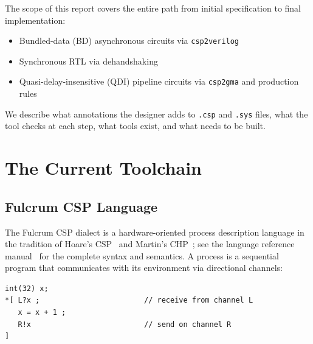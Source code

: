 \documentclass[11pt]{article}
\begin{document}
The scope of this report covers the entire path from initial
specification to final implementation:
\begin{itemize}
\item Bundled-data (BD) asynchronous circuits via \texttt{csp2verilog}
\item Synchronous RTL via dehandshaking
\item Quasi-delay-insensitive (QDI) pipeline circuits via
  \texttt{csp2gma} and production rules
\end{itemize}
We describe what annotations the designer adds to \texttt{.csp} and
\texttt{.sys} files, what the tool checks at each step, what tools
exist, and what needs to be built.

\section{The Current Toolchain}
\label{sec:current}

\subsection{Fulcrum CSP Language}

The Fulcrum CSP dialect is a hardware-oriented
process description language in the tradition of Hoare's
CSP~\cite{hoare1985} and Martin's CHP~\cite{martin1990}; see the
language reference manual~\cite{nystrom2025csp} for the complete
syntax and semantics.  A process
is a sequential program that communicates with its environment via
directional channels:

\begin{Verbatim}[samepage=true]
int(32) x;
*[ L?x ;                        // receive from channel L
   x = x + 1 ;
   R!x                          // send on channel R
]
\end{Verbatim}
\end{document}
